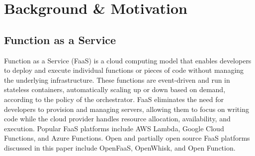 \section{Background \& Motivation}
\label{sec:background}


\subsection{Function as a Service}
Function as a Service (FaaS) is a cloud computing model that enables developers to deploy and execute individual functions or pieces of code without managing the underlying infrastructure.
These functions are event-driven and run in stateless containers, automatically scaling up or down based on demand, according to the policy of the orchestrator.
FaaS eliminates the need for developers to provision and managing servers, allowing them to focus on writing code while the cloud provider handles resource allocation, availability, and execution.
Popular FaaS platforms include AWS Lambda, Google Cloud Functions, and Azure Functions.
Open and partially open source FaaS platforms discussed in this paper include OpenFaaS, OpenWhisk, and Open Function.

